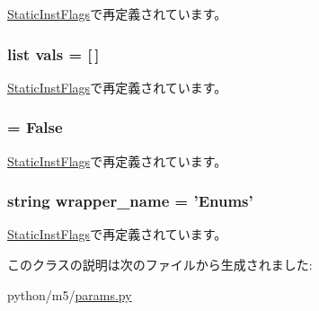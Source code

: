 \hyperlink{classStaticInstFlags_1_1StaticInstFlags_a8a0a62d3d14654ce0a39c073e37b3448}{StaticInstFlags}で再定義されています。\hypertarget{classm5_1_1params_1_1Enum_ac8dfdb1d5e96e93836fb573bc3cd2110}{
\subsubsection[{vals}]{\setlength{\rightskip}{0pt plus 5cm}list {\bf vals} = \mbox{[}$\,$\mbox{]}}}
\label{classm5_1_1params_1_1Enum_ac8dfdb1d5e96e93836fb573bc3cd2110}


\hyperlink{classStaticInstFlags_1_1StaticInstFlags_ac8dfdb1d5e96e93836fb573bc3cd2110}{StaticInstFlags}で再定義されています。\hypertarget{classm5_1_1params_1_1Enum_afcc7a4b78ecd8fa7e713f8cfa0f51017}{
\subsubsection[{value}]{}}
\label{classm5_1_1params_1_1Enum_afcc7a4b78ecd8fa7e713f8cfa0f51017}
\hypertarget{classm5_1_1params_1_1Enum_a774c4f5a238e6bd6cc19b2ad18ec0f4f}{
\subsubsection[{wrapper\_\-is\_\-struct}]{ = False}}
\label{classm5_1_1params_1_1Enum_a774c4f5a238e6bd6cc19b2ad18ec0f4f}


\hyperlink{classStaticInstFlags_1_1StaticInstFlags_a774c4f5a238e6bd6cc19b2ad18ec0f4f}{StaticInstFlags}で再定義されています。\hypertarget{classm5_1_1params_1_1Enum_a8d8e670fd263dbfded71859e88b6ac8b}{
\subsubsection[{wrapper\_\-name}]{\setlength{\rightskip}{0pt plus 5cm}string {\bf wrapper\_\-name} = 'Enums'}}
\label{classm5_1_1params_1_1Enum_a8d8e670fd263dbfded71859e88b6ac8b}


\hyperlink{classStaticInstFlags_1_1StaticInstFlags_a8d8e670fd263dbfded71859e88b6ac8b}{StaticInstFlags}で再定義されています。

このクラスの説明は次のファイルから生成されました:\begin{DoxyCompactItemize}
\item 
python/m5/\hyperlink{params_8py}{params.py}\end{DoxyCompactItemize}
